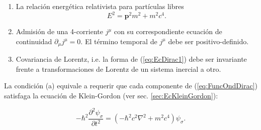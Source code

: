 \begin{enumerate}[\hspace{15pt}(a)]
 \item La relación energética relativista para partículas libres
 \begin{equation*}
  E^2=\mathbf{p}^2m^2+m^2c^4.
 \end{equation*}

 \item Admisión de una 4-corriente $j^\mu$ con su correspondiente ecuación de continuidad $\partial_\mu j^\mu=0$. El término temporal de $j^\mu$ debe ser positivo-definido.
 
 \item Covariancia de Lorentz, i.e. la forma de (\ref{eq:EcDirac1}) debe ser invariante frente a transformaciones de Lorentz de un sistema inercial a otro.
 \end{enumerate}


La condición (a) equivale a requerir que cada componente de (\ref{eq:FuncOndDirac}) satisfaga la ecuación de Klein-Gordon (ver sec. \ref{sec:EcKleinGordon}):

\begin{equation}\label{eq:KGparaDirac}
 -\hbar^2\frac{\partial^2 \psi_\sigma}{\partial t^2}=(-\hbar^2c^2\nabla^2+m^2c^4)\psi_\sigma.
\end{equation}

